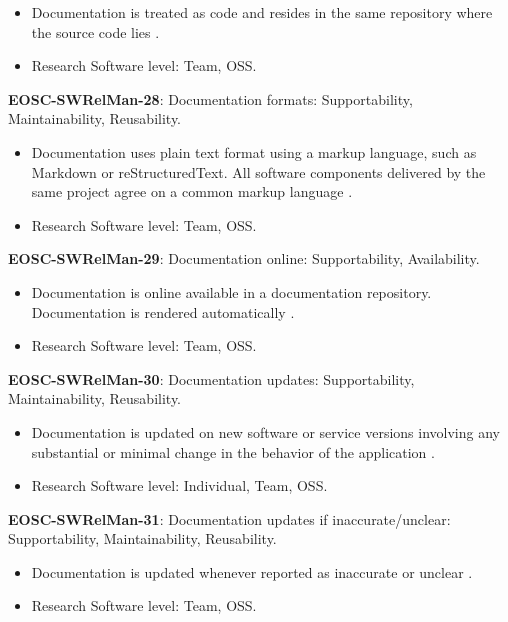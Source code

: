 \begin{itemize}
    \item Documentation is treated as code and resides in the same repository where the source code lies \cite{orviz_set_2017}.
    \item Research Software level: Team, OSS.
\end{itemize}

\textbf{EOSC-SWRelMan-28}: Documentation formats: Supportability, Maintainability, Reusability.

\begin{itemize}
    \item Documentation uses plain text format using a markup language, such as Markdown or reStructuredText. All software components delivered by the same project agree on a common markup language \cite{orviz_set_2017,raymond_software_2013}.
    \item Research Software level: Team, OSS.
\end{itemize}

\textbf{EOSC-SWRelMan-29}: Documentation online: Supportability, Availability.

\begin{itemize}
    \item Documentation is online available in a documentation repository. Documentation is rendered automatically \cite{orviz_set_2017,orviz_fernandez_eosc-synergy_2020}.
    \item Research Software level: Team, OSS.
\end{itemize}

\textbf{EOSC-SWRelMan-30}: Documentation updates: Supportability, Maintainability, Reusability.

\begin{itemize}
    \item Documentation is updated on new software or service versions involving any substantial or minimal change in the behavior of the application \cite{orviz_set_2017,orviz_fernandez_eosc-synergy_2020,raymond_software_2013}.
    \item Research Software level: Individual, Team, OSS.
\end{itemize}

\textbf{EOSC-SWRelMan-31}: Documentation updates if inaccurate/unclear: Supportability, Maintainability, Reusability.

\begin{itemize}
    \item Documentation is updated whenever reported as inaccurate or unclear \cite{orviz_set_2017,orviz_fernandez_eosc-synergy_2020}.
    \item Research Software level: Team, OSS.
\end{itemize}

